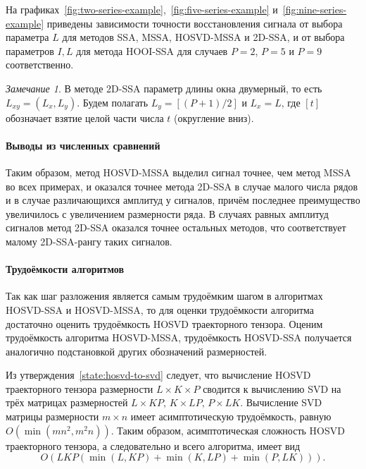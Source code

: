 \documentclass[specialist,
    substylefile = spbu.rtx,
    subf,href,colorlinks=true, 12pt]{disser}
\theoremstyle{plain}
\theoremstyle{definition}
\theoremstyle{remark}
\newtheorem*{remark}{Замечание}
\begin{document}
    На графиках~\ref{fig:two-series-example},~\ref{fig:five-series-example} и~\ref{fig:nine-series-example}
    приведены зависимости точности восстановления
    сигнала от выбора параметра $L$ для методов SSA, MSSA, HOSVD-MSSA и 2D-SSA, и от
    выбора параметров $I, L$ для метода HOOI-SSA
    для случаев $P=2$, $P=5$ и $P=9$
    соответственно.

    \begin{remark}
        В методе 2D-SSA параметр длины окна двумерный, то есть $L_{xy}=(L_x, L_y)$.
        Будем полагать $L_y = [(P + 1) / 2]$ и $L_x=L$, где $[t]$ обозначает взятие
        целой части числа $t$ (округление вниз).
    \end{remark}
    
    \paragraph{Выводы из численных сравнений}\label{par:numerical-comparison-res}
    Таким образом, метод HOSVD-MSSA выделил сигнал точнее, чем метод MSSA во всех примерах, и
    оказался точнее метода 2D-SSA в случае малого числа рядов и в случае различающихся
    амплитуд у сигналов, причём последнее преимущество увеличилось с увеличением размерности ряда.
    В случаях равных амплитуд сигналов метод 2D-SSA оказался точнее остальных методов, 
    что соответствует малому 2D-SSA-рангу таких сигналов.
    
    \paragraph{Трудоёмкости алгоритмов}\label{par:alg-complexity}
    Так как шаг разложения является самым трудоёмким шагом в алгоритмах HOSVD-SSA и HOSVD-MSSA,
    то для оценки трудоёмкости алгоритма достаточно оценить трудоёмкость HOSVD траекторного тензора.
    Оценим трудоёмкость алгоритма HOSVD-MSSA, трудоёмкость HOSVD-SSA получается аналогично подстановкой
    других обозначений размерностей.
    
    Из утверждения~\ref{state:hosvd-to-svd} следует, что вычисление HOSVD траекторного тензора размерности ${L\times K \times P}$
    сводится к вычислению SVD на трёх матрицах размерностей \linebreak $L\times KP,\, K\times LP,\, P\times LK$.
    Вычисление SVD матрицы размерности $m\times n$ имеет асимптотическую трудоёмкость, равную $O(\min(mn^2, m^2 n)).$
    Таким образом, асимптотическая сложность HOSVD траекторного тензора, а следовательно и всего алгоритма, имеет вид
    \begin{equation}
        \label{eq:hosvd-mssa-complexity}
        O\left(LKP(\min(L, KP) + \min(K, LP) + \min(P, LK))\right).
    \end{equation}
    
\end{document}

